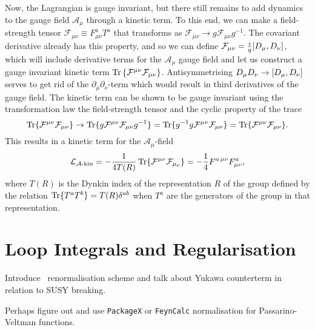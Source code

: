\documentclass[../main.tex]{subfiles}
\begin{document}
Now, the Lagrangian is gauge invariant, but there still remains to add dynamics
to the gauge field \(\mathcal{A}_\mu\) through a kinetic term.
To this end, we can make a field-strength tensor \(\mathcal{F}_{\mu\nu} \equiv
F_{\mu\nu}^a T^a\) that transforms as \(\mathcal{F}_{\mu\nu} \to g
\mathcal{F}_{\mu\nu} g^{-1}\).
The covariant derivative already has this property, and so we can define
\(\mathcal{F}_{\mu\nu} = \frac{i}{q} [D_\mu,D_\nu]\), which will include
derivative terms for the \(\mathcal{A}_\mu\) gauge field and let us construct a
gauge invariant kinetic term \(\operatorname{Tr}\left\{\mathcal{F}^{\mu\nu} \mathcal{F}_{\mu\nu}\right\}\).
Antisymmetrising \(D_\mu D_\nu \to [D_\mu,D_\nu]\) serves to get rid of the \(\partial_\mu \partial_\nu\)-term which would result in third derivatives of the gauge field.
The kinetic term can be shown to be gauge invariant using the transformation law the field-strength tensor and the cyclic property of the trace
\begin{equation}
  \operatorname{Tr}\{\mathcal{F}^{\mu\nu} \mathcal{F}_{\mu\nu}\} \to
  \operatorname{Tr}\{g \mathcal{F}^{\mu\nu} \mathcal{F}_{\mu\nu} g^{-1}\} =
  \operatorname{Tr}\{g^{-1} g \mathcal{F}^{\mu\nu} \mathcal{F}_{\mu\nu}\} =
  \operatorname{Tr}\{\mathcal{F}^{\mu\nu} \mathcal{F}_{\mu\nu}\}.
\end{equation}
This results in a kinetic term for the \(\mathcal{A}_\mu\)-field
\begin{equation}
  \label{qft:eq:Akin}
  \mathcal{L}_{\mathcal{A}\text{-kin}} = -\frac{1}{4T(R)} \operatorname{Tr}\{\mathcal{F}^{\mu\nu} \mathcal{F}_{\mu_\nu}\} = -\frac{1}{4} F^{a\,\mu\nu} F^a_{\mu\nu},
\end{equation}
where \(T(R)\) is the Dynkin index of the representation \(R\) of the group defined by the relation \(\operatorname{Tr}\{T^a T^b\} = T(R) \delta^{ab}\) when \(T^a\) are the generators of the group in that representation.





\section{Loop Integrals and Regularisation}
\begin{TODO}
  \item Introduce \DRbar\ renormalisation scheme and talk about Yukawa counterterm in relation to SUSY breaking.
  \item Perhaps figure out and use \verb|PackageX| or \verb|FeynCalc| normalisation for Passarino-Veltman functions.
\end{TODO}
\end{document}
